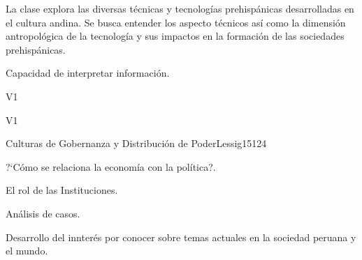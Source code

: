 \begin{syllabus}


\begin{justification}
La clase explora las diversas técnicas y  tecnologías prehispánicas desarrolladas en el cultura andina. Se busca entender los aspecto técnicos así como la dimensión antropológica de la tecnología y sus impactos en la formación de las sociedades prehispánicas.
\end{justification}

\begin{goals}
\item Capacidad de interpretar información.
\end{goals}

\begin{outcomes}{V1}
    \item {}
    \item {}
    \item {}
    
\end{outcomes}

\begin{competences}{V1}
    \item {}
    \item {}
    \item {}
    \item {}
\end{competences}

\begin{unit}{Culturas de Gobernanza y Distribución de Poder}{}{Lessig15}{12}{4}
   \begin{topics}
      \item ?`Cómo se relaciona la economía con la política?.
      \item El rol de las Instituciones.
      \item Análisis de casos.
   \end{topics}
   \begin{learningoutcomes}
      \item Desarrollo del innterés por conocer sobre temas actuales en la sociedad peruana y el mundo.
   \end{learningoutcomes}
\end{unit}

\begin{coursebibliography}
\end{coursebibliography}

\end{syllabus}
